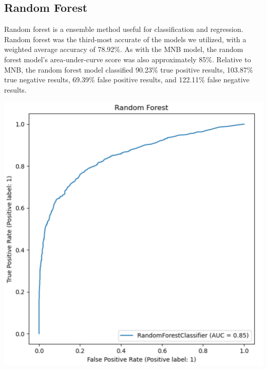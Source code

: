 \documentclass[11pt]{diazessay} %
\begin{document}
\subsection{Random Forest}

Random forest is a ensemble method useful for classification and regression. Random forest was the third-most accurate of the models we utilized, with a weighted average accuracy of 78.92\%. As with the MNB model, the random forest model's area-under-curve score was also approximately 85\%. Relative to MNB, the random forest model classified 90.23\% true positive results, 103.87\% true negative results, 69.39\% false positive results, and 122.11\% false negative results.

\begin{minipage}[t]{.45\linewidth}
\includegraphics[width=\linewidth]{images/rf_plot.png}
\end{minipage}\hfill
\end{document}
